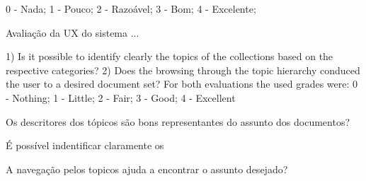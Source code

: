 0 - Nada;
1 - Pouco;
2 - Razoável;
3 - Bom;
4 - Excelente;



Avaliação da UX do sistema ...























1) Is it possible to identify clearly the topics of the collections
based on the respective categories?
2) Does the browsing through the topic hierarchy conduced
the user to a desired document set?
For both evaluations the used grades were:
0 - Nothing;
1 - Little;
2 - Fair;
3 - Good;
4 - Excellent


\item Os descritores dos tópicos são bons representantes do assunto dos documentos?
\item É possível indentificar claramente os 
\item A navegação pelos topicos ajuda a encontrar o assunto desejado?







%

%


